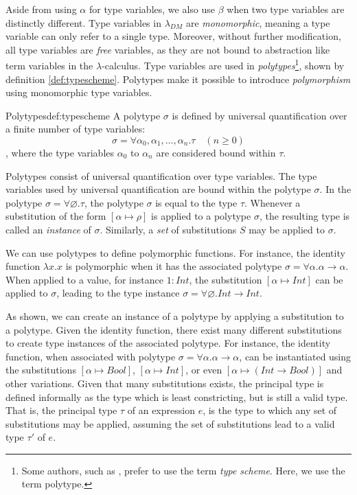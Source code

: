 Aside from using $\alpha$ for type variables, we also use $\beta$ when two type variables are distinctly different.
Type variables in $\lambda_{DM}$ are \textit{monomorphic}, meaning a type variable can only refer to a single type.
Moreover, without further modification, all type variables are \textit{free} variables, as they are not bound to abstraction like term variables in the $\lambda$-calculus.
Type variables are used in \textit{polytypes}\footnote{Some authors, such as \citeauthor{milner1978theory}, prefer to use the term \textit{type scheme}. Here, we use the term polytype.}, shown by definition \ref{def:typescheme}.
Polytypes make it possible to introduce \textit{polymorphism} using monomorphic type variables. 

\begin{definitiontitled}{Polytypes}{def:typescheme}
A polytype $\sigma$ is defined by universal quantification over a finite number of type variables:
\[
\sigma = \forall \alpha_0,\alpha_1, \ldots, \alpha_n. \tau \quad (n \ge 0)
\]
, where the type variables $\alpha_0$ to $\alpha_n$ are considered bound within $\tau$.
\end{definitiontitled}

Polytypes consist of universal quantification over type variables.
The type variables used by universal quantification are bound within the polytype $\sigma$.
In the polytype $\sigma = \forall \varnothing.\tau$, the polytype $\sigma$ is equal to the type $\tau$.
Whenever a substitution of the form $[\alpha \mapsto \rho]$ is applied to a polytype $\sigma$, the resulting type is called an \textit{instance} of $\sigma$.
Similarly, a \textit{set} of substitutions $S$ may be applied to $\sigma$.

We can use polytypes to define polymorphic functions.
For instance, the identity function $\lambda x.x$ is polymorphic when it has the associated polytype $\sigma = \forall \alpha. \alpha \rightarrow \alpha$.
When applied to a value, for instance $1 : \textit{Int}$, the substitution $[\alpha \mapsto Int]$ can be applied to $\sigma$, leading to the type instance $\sigma = \forall \varnothing. \textit{Int} \rightarrow \textit{Int}$.

As shown, we can create an instance of a polytype by applying a substitution to a polytype.
Given the identity function, there exist many different substitutions to create type instances of the associated polytype.
For instance, the identity function, when associated with polytype $\sigma = \forall \alpha. \alpha \rightarrow \alpha$, can be instantiated using the substitutions $[\alpha \mapsto \textit{Bool}]$, $[\alpha \mapsto \textit{Int}]$, or even $[\alpha \mapsto (\textit{Int} \rightarrow \textit{Bool})]$ and other variations.
Given that many substitutions exists, the principal type is defined informally as the type which is least constricting, but is still a valid type.
That is, the principal type $\tau$ of an expression $e$, is the type to which any set of substitutions may be applied, assuming the set of substitutions lead to a valid type $\tau'$ of $e$.

